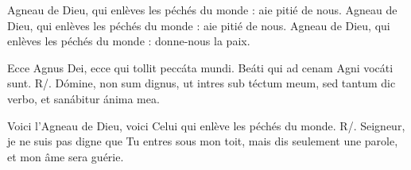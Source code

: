 Agneau de Dieu, qui enlèves les péchés du monde : aie pitié de nous.
Agneau de Dieu, qui enlèves les péchés du monde : aie pitié de nous.
Agneau de Dieu, qui enlèves les péchés du monde : donne-nous la paix.



Ecce Agnus Dei, ecce qui tollit peccáta mundi. Beáti qui ad cenam Agni vocáti sunt.
R/. Dómine, non sum dignus, ut intres sub téctum meum, sed tantum dic verbo, et sanábitur ánima mea.

Voici l’Agneau de Dieu, voici Celui qui enlève les péchés du monde.
R/. Seigneur, je ne suis pas digne que Tu entres sous mon toit, mais dis seulement une parole, et mon âme sera guérie.

